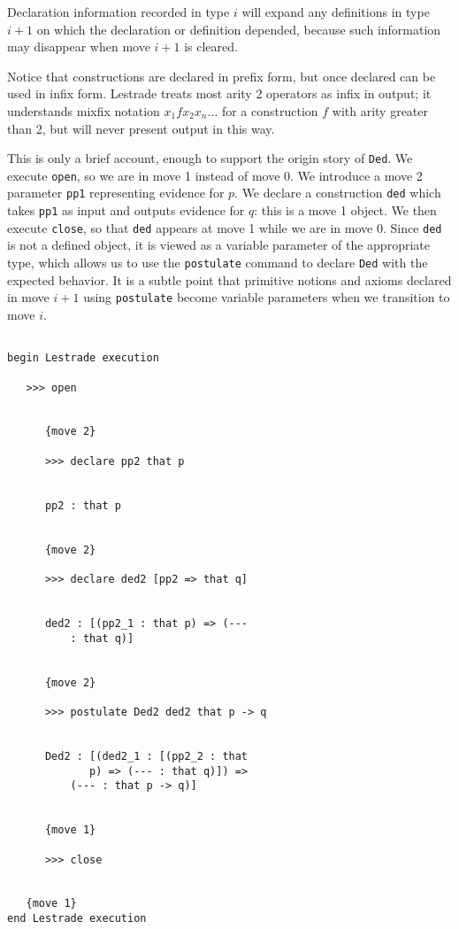 \documentclass[12pt]{article}
\begin{document}
Declaration information recorded in type $i$ will expand any definitions in type $i+1$ on which the declaration or definition depended, because such information may disappear
when move $i+1$ is cleared.

Notice that constructions are declared in prefix form, but once declared can be used in infix form.  Lestrade treats most arity 2 operators as infix in output;  it understands mixfix notation $x_1 f x_2 x_n\ldots$ for a construction $f$ with arity greater than 2, but will never present output in this way.

This is only a brief account, enough to support the origin story of {\tt Ded}.  We execute {\tt open}, so we are in move 1 instead of move 0.  We introduce a move 2
parameter {\tt pp1} representing evidence for $p$.  We declare a construction {\tt ded} which takes {\tt pp1} as input and outputs evidence for $q$:  this is a move 1 object.
We then execute {\tt close}, so that {\tt ded} appears at move 1 while we are in move 0.  Since {\tt ded} is not a defined object, it is viewed as a variable parameter of the appropriate type,
which allows us to use the {\tt postulate} command to declare {\tt Ded} with the expected behavior.  It is a subtle point that primitive notions and axioms declared in move $i+1$ using
{\tt postulate} become variable parameters when we transition to move $i$.

\begin{verbatim}

begin Lestrade execution

   >>> open


      {move 2}

      >>> declare pp2 that p


      pp2 : that p


      {move 2}

      >>> declare ded2 [pp2 => that q]


      ded2 : [(pp2_1 : that p) => (--- 
          : that q)]


      {move 2}

      >>> postulate Ded2 ded2 that p -> q


      Ded2 : [(ded2_1 : [(pp2_2 : that 
             p) => (--- : that q)]) => 
          (--- : that p -> q)]


      {move 1}

      >>> close


   {move 1}
end Lestrade execution
\end{verbatim}
\end{document}
